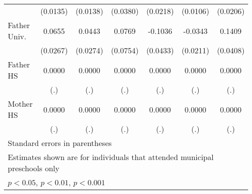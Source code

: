 \begin{table}[htbp]
\begin{tabular}{l*{6}{c}}
            &    (0.0135)         &    (0.0138)         &    (0.0380)         &    (0.0218)         &    (0.0106)         &    (0.0206)         \\
\addlinespace
Father Univ.&      0.0655\sym{*}  &      0.0443         &      0.0769         &     -0.1036\sym{*}  &     -0.0343         &      0.1409\sym{***}\\
            &    (0.0267)         &    (0.0274)         &    (0.0754)         &    (0.0433)         &    (0.0211)         &    (0.0408)         \\
\addlinespace
Father HS   &      0.0000         &      0.0000         &      0.0000         &      0.0000         &      0.0000         &      0.0000         \\
            &         (.)         &         (.)         &         (.)         &         (.)         &         (.)         &         (.)         \\
\addlinespace
Mother HS   &      0.0000         &      0.0000         &      0.0000         &      0.0000         &      0.0000         &      0.0000         \\
            &         (.)         &         (.)         &         (.)         &         (.)         &         (.)         &         (.)         \\
\bottomrule
\multicolumn{7}{l}{\footnotesize Standard errors in parentheses}\\
\multicolumn{7}{l}{\footnotesize Estimates shown are for individuals that attended municipal preschools only}\\
\multicolumn{7}{l}{\footnotesize \sym{*} \(p<0.05\), \sym{**} \(p<0.01\), \sym{***} \(p<0.001\)}\\
\end{tabular}
\end{table}
